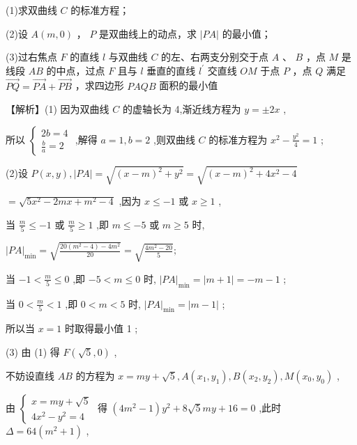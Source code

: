 \documentclass[10pt]{article}
\begin{document}
(1)求双曲线 \(C\) 的标准方程；

(2)设 \(A\left( {m,0}\right)\) ， \(P\) 是双曲线上的动点，求 \(\left| {PA}\right|\) 的最小值；

(3)过右焦点 \(F\) 的直线 \(l\) 与双曲线 \(C\) 的左、右两支分别交于点 \(A\) 、 \(B\) ，点 \(M\) 是线段 \({AB}\) 的中点，过点 \(F\) 且与 \(l\) 垂直的直线 \({l}^{\prime }\) 交直线 \({OM}\) 于点 \(P\) ，点 \(Q\) 满足 \(\overrightarrow{PQ} = \overrightarrow{PA} + \overrightarrow{PB}\) ，求四边形 \({PAQB}\) 面积的最小值

【解析】(1) 因为双曲线 \(C\) 的虚轴长为 4,渐近线方程为 \(y =  \pm  {2x}\) ,

所以 \(\left\{  \begin{array}{l} {2b} = 4 \\  \frac{b}{a} = 2 \end{array}\right.\) ,解得 \(a = 1,b = 2\) ,则双曲线 \(C\) 的标准方程为 \({x}^{2} - \frac{{y}^{2}}{4} = 1\) ;

(2)设 \(P\left( {x,y}\right) ,\left| {PA}\right|  = \sqrt{{\left( x - m\right) }^{2} + {y}^{2}} = \sqrt{{\left( x - m\right) }^{2} + 4{x}^{2} - 4}\)

\(= \sqrt{5{x}^{2} - {2mx} + {m}^{2} - 4}\) ,因为 \(x \leq   - 1\) 或 \(x \geq  1\) ,

当 \(\frac{m}{5} \leq   - 1\) 或 \(\frac{m}{5} \geq  1\) ,即 \(m \leq   - 5\) 或 \(m \geq  5\) 时,

\({\left| PA\right| }_{\min } = \sqrt{\frac{{20}\left( {{m}^{2} - 4}\right)  - 4{m}^{2}}{20}} = \sqrt{\frac{4{m}^{2} - {20}}{5}};\)

当 \(- 1 < \frac{m}{5} \leq  0\) ,即 \(- 5 < m \leq  0\) 时, \({\left| PA\right| }_{\min } = \left| {m + 1}\right|  =  - m - 1\) ;

当 \(0 < \frac{m}{5} < 1\) ,即 \(0 < m < 5\) 时, \({\left| PA\right| }_{\min } = \left| {m - 1}\right|\) ;

所以当 \(x = 1\) 时取得最小值 1 ;

(3) 由 (1) 得 \(F\left( {\sqrt{5},0}\right)\) ,

不妨设直线 \({AB}\) 的方程为 \(x = {my} + \sqrt{5},A\left( {{x}_{1},{y}_{1}}\right) ,B\left( {{x}_{2},{y}_{2}}\right) ,M\left( {{x}_{0},{y}_{0}}\right)\) ,

由 \(\left\{  \begin{array}{l} x = {my} + \sqrt{5} \\  4{x}^{2} - {y}^{2} = 4 \end{array}\right.\) 得 \(\left( {4{m}^{2} - 1}\right) {y}^{2} + 8\sqrt{5}{my} + {16} = 0\) ,此时 \(\Delta  = {64}\left( {{m}^{2} + 1}\right)\) ,
\end{document}
